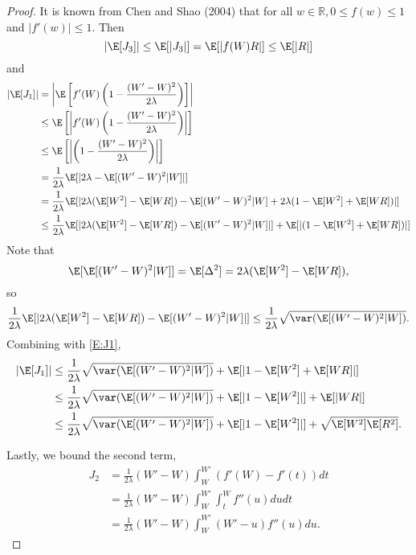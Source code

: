 \begin{proof}
  It is known from Chen and Shao (2004) that for all $w \in \mathbb{R}, 0 \leq f(w) \leq 1$ and
  $|f'(w)| \leq 1$.  Then
  \begin{equation}
    |\E [J_3]| \leq \E [|J_3|] = \E [|f(W)R|] \leq \E [|R|]
  \end{equation}
  and
  \begin{equation}
    \label{E:J1}
    \begin{split}
      |\E [J_1] | &= \left | \E \left [f'(W)\left (1-\frac{(W'-W)^2}{2\lambda} \right ) \right ]
      \right | \\
      &\leq \E \left [\left | f'(W)\left (1-\frac{(W'-W)^2}{2\lambda} \right ) \right | \right ] \\
      &\leq \E \left [ \left | \left (1-\frac{(W'-W)^2}{2\lambda} \right )  \right | \right ] \\
      &= \frac{1}{2\lambda} \E [|2\lambda - \E [(W'-W)^2|W]|] \\
      &= \frac{1}{2\lambda} \E [|2\lambda (\E [W^2] - \E [WR]) - \E [(W'-W)^2|W] + 
      2\lambda (1 - \E [W^2] + \E [WR])|] \\
      &\leq \frac{1}{2\lambda} \E [|2\lambda (\E [W^2] - \E [WR]) - \E [(W'-W)^2|W]|] + 
      \E [|(1 - \E [W^2] + \E [WR])|]
    \end{split}
  \end{equation}
  Note that 
  \begin{equation}
    \E [\E [(W'-W)^2|W]] = \E [\Delta^2] = 2 \lambda (\E [W^2] - \E [WR]),
  \end{equation}
  so
  \begin{equation}
    \frac{1}{2\lambda} \E [|2\lambda (\E [W^2] - \E [WR]) - \E [(W'-W)^2|W]|] \leq
    \frac{1}{2\lambda} \sqrt{\var (\E [(W'-W)^2|W])}.
  \end{equation}
  Combining with \eqref{E:J1},
  \begin{equation}
    \begin{split}
      |\E [J_1] | &\leq \frac{1}{2\lambda} \sqrt{\var (\E [(W'-W)^2|W])} +
      \E [|1 - \E [W^2] + \E [WR]|] \\
      &\leq \frac{1}{2\lambda} \sqrt{\var (\E [(W'-W)^2|W])} + \E [|1 - \E [W^2]|] + \E [|WR|] \\
      &\leq \frac{1}{2\lambda} \sqrt{\var (\E [(W'-W)^2|W])} + \E [|1 - \E [W^2]|] + 
      \sqrt{\E [W^2]\E [R^2]}.
    \end{split}
  \end{equation}
  
  Lastly, we bound the second term, 
  \begin{equation}
    \begin{split}
      J_2 &= \frac{1}{2 \lambda}(W'-W)\int_W^{W'} (f'(W)-f'(t)) dt \\
      &= \frac{1}{2 \lambda}(W'-W)\int_W^{W'}\int_t^Wf''(u) du dt \\
      &= \frac{1}{2 \lambda}(W'-W)\int_W^{W'} (W'-u)f''(u) du.
    \end{split}
  \end{equation}

\end{proof}

